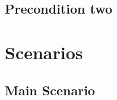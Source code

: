 \documentclass[notitlepage]{article}
\begin{document}
\subsection{Precondition two}

\section{Scenarios}\label{sec:scenarios}

\subsection{Main Scenario}\label{subsec:main:scenario}
\end{document}
